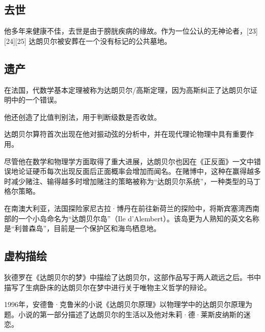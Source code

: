 \subsection{去世}
他多年来健康不佳，去世是由于膀胱疾病的缘故。作为一位公认的无神论者，[23][24][25] 达朗贝尔被安葬在一个没有标记的公共墓地。
\subsection{遗产}

在法国，代数学基本定理被称为达朗贝尔/高斯定理，因为高斯纠正了达朗贝尔证明中的一个错误。

他还创造了比值判别法，用于判断级数是否收敛。

达朗贝尔算符首次出现在他对振动弦的分析中，并在现代理论物理中具有重要作用。

尽管他在数学和物理学方面取得了重大进展，达朗贝尔也因在《正反面》一文中错误地论证硬币每次出现反面后正面概率会增加而闻名。在赌博中，这种在赢得越多时减少赌注、输得越多时增加赌注的策略被称为“达朗贝尔系统”，一种类型的马丁格尔策略。

在南澳大利亚，法国探险家尼古拉·博丹在前往新荷兰的探险中，将斯宾塞湾西南部的一个小岛命名为“达朗贝尔岛”（Ile d'Alembert）。该岛更为人熟知的英文名称是“利普森岛”，目前是一个保护区和海鸟栖息地。
\subsection{虚构描绘}
狄德罗在《达朗贝尔的梦》中描绘了达朗贝尔，这部作品写于两人疏远之后。书中描写了生病卧床的达朗贝尔在梦中进行关于唯物主义哲学的辩论。

1996年，安德鲁·克鲁米的小说《达朗贝尔原理》以物理学中的达朗贝尔原理为题。小说的第一部分描述了达朗贝尔的生活以及他对朱莉·德·莱斯皮纳斯的迷恋。
